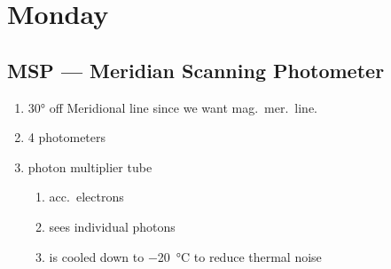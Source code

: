 \section{Monday}
\subsection{MSP --- Meridian Scanning Photometer}
\begin{enumerate}[\(\bullet \)]
    \item 30° off Meridional line since we want mag.\ mer.\ line.
    \item 4 photometers
    \item photon multiplier tube\begin{enumerate}[\(\triangleright \)]
        \item acc.\ electrons
        \item sees individual photons
        \item is cooled down to \SI{-20}{\celsius} to reduce thermal noise
    \end{enumerate}
\end{enumerate}

